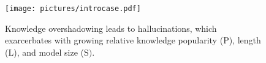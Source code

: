 \begin{figure}
    \centering
    \texttt{[image: pictures/introcase.pdf]}
    \vspace{-1.8em}
    \caption{Knowledge overshadowing leads to hallucinations, which exarcerbates with growing relative knowledge popularity ($\text{P}$), length ($\text{L}$), and model size ($\text{S})$.
    }
\label{fig:intro_case}
\vspace{-1.3em}
\end{figure}